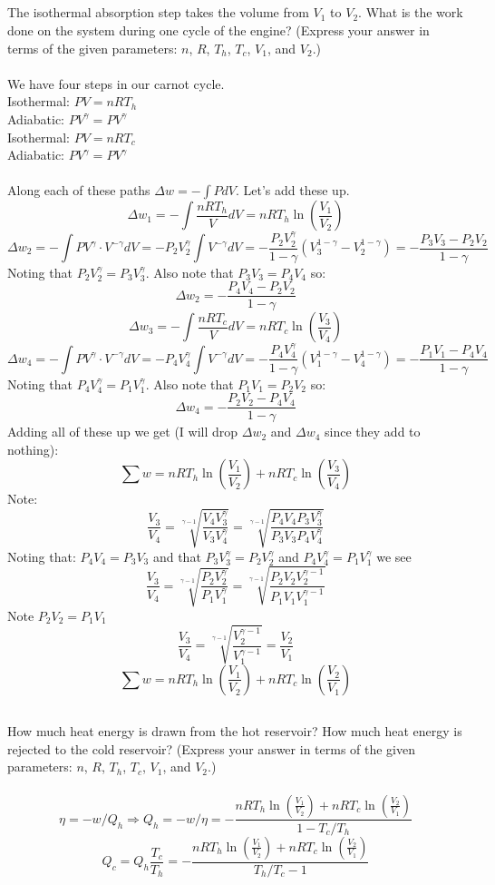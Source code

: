 \documentclass[10pt,a4paper]{article}
\begin{document}
\subsection{}
The isothermal absorption step takes the volume from $V_1$ to $V_2$. What is the work done on the system during one cycle of the engine? (Express your answer in terms of the given parameters: $n$, $R$, $T_h$, $T_c$, $V_1$, and $V_2$.)\\\\
We have four steps in our carnot cycle.\\
Isothermal: $PV=nRT_h$\\
Adiabatic: $PV^\gamma=PV^\gamma$\\
Isothermal: $PV=nRT_c$\\
Adiabatic: $PV^\gamma=PV^\gamma$\\\\
Along each of these paths $\Delta w=-\int PdV$.  Let's add these up.\\
$$\Delta w_1=-\int \frac{nRT_h}{V}dV=nRT_h\ln(\frac{V_1}{V_2})$$
$$\Delta w_2=-\int PV^\gamma\cdot V^{-\gamma} dV=- P_2 V_2^\gamma\int V^{-\gamma} dV=-\frac{P_2 V_2^\gamma}{1-\gamma} (V_3^{1-\gamma}-V_2^{1-\gamma})=-\frac{P_3 V_3-P_2 V_2}{1-\gamma}$$
Noting that $P_2 V_2^\gamma=P_3 V_3^\gamma$.  Also note that $P_3 V_3=P_4 V_4$ so:
$$\Delta w_2=-\frac{P_4 V_4-P_2 V_2}{1-\gamma}$$
$$\Delta w_3=-\int \frac{nRT_c}{V}dV=nRT_c\ln(\frac{V_3}{V_4})$$
$$\Delta w_4=-\int PV^\gamma\cdot V^{-\gamma} dV=- P_4 V_4^\gamma\int V^{-\gamma} dV=-\frac{P_4 V_4^\gamma}{1-\gamma} (V_1^{1-\gamma}-V_4^{1-\gamma})=-\frac{P_1 V_1-P_4 V_4}{1-\gamma}$$
Noting that $P_4 V_4^\gamma=P_1 V_1^\gamma$.  Also note that $P_1 V_1=P_2 V_2$ so:
$$\Delta w_4=-\frac{P_2 V_2-P_4 V_4}{1-\gamma}$$
Adding all of these up we get (I will drop $\Delta w_2$ and $\Delta w_4$ since they add to nothing):
$$\sum w=nRT_h\ln(\frac{V_1}{V_2})+nRT_c\ln(\frac{V_3}{V_4})$$
Note:
$$\frac{V_3}{V_4}=\sqrt[\gamma-1]{\frac{V_4 V_3^\gamma}{V_3 V_4^\gamma}}=\sqrt[\gamma-1]{\frac{P_4 V_4 P_3V_3^\gamma}{P_3 V_3 P_4 V_4^\gamma}}$$
Noting that: 
$P_4 V_4=P_3 V_3$
and that 
$P_3V_3^\gamma=P_2V_2^\gamma$
and 
$P_4 V_4^\gamma=P_1 V_1^\gamma$
we see
$$\frac{V_3}{V_4}=\sqrt[\gamma-1]{\frac{P_2V_2^\gamma}{P_1 V_1^\gamma}}=\sqrt[\gamma-1]{\frac{P_2V_2V_2^{\gamma-1}}{P_1 V_1V_1^{\gamma-1}}}$$
Note $P_2 V_2=P_1 V_1$
$$\frac{V_3}{V_4}=\sqrt[\gamma-1]{\frac{V_2^{\gamma-1}}{V_1^{\gamma-1}}}=\frac{V_2}{V_1}$$
$$\sum w=nRT_h\ln(\frac{V_1}{V_2})+nRT_c\ln(\frac{V_2}{V_1})$$
\subsection{}
How much heat energy is drawn from the hot reservoir? How much heat energy is rejected to the cold reservoir? (Express your answer in terms of the given parameters: $n$, $R$, $T_h$, $T_c$, $V_1$, and $V_2$.)\\\\
$$\eta=-w/Q_h\Rightarrow Q_h=-w/\eta=-\frac{nRT_h\ln(\frac{V_1}{V_2})+nRT_c\ln(\frac{V_2}{V_1})}{1-T_c/T_h}$$
$$Q_c=Q_h\frac{T_c}{T_h}=-\frac{nRT_h\ln(\frac{V_1}{V_2})+nRT_c\ln(\frac{V_2}{V_1})}{T_h/T_c-1}$$
\end{document}
